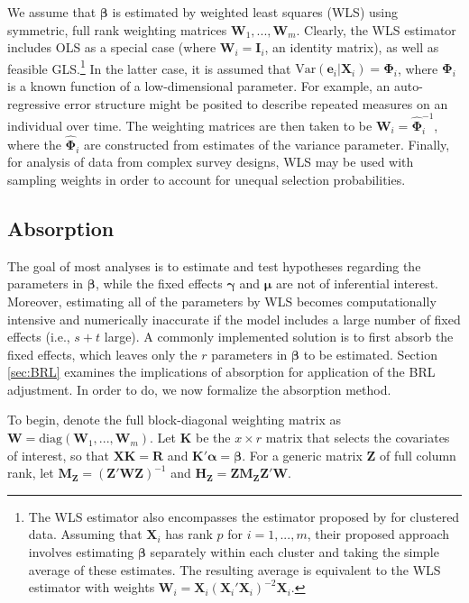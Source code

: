 \documentclass[12pt]{article}\usepackage[]{graphicx}\usepackage[]{color}
\newcommand{\Var}{\text{Var}}
\newcommand{\bm}{\mathbf}
\newcommand{\bs}{\boldsymbol}
\begin{document}
We assume that $\bs\beta$ is estimated by weighted least squares (WLS) using symmetric, full rank weighting matrices $\bm{W}_1,...,\bm{W}_m$. 
Clearly, the WLS estimator includes OLS as a special case (where $\bm{W}_i = \bm{I}_i$, an identity matrix), as well as feasible GLS.\footnote{
The WLS estimator also encompasses the estimator proposed by \citet{Ibragimov2010tstatistic} for clustered data. 
Assuming that $\bm{X}_i$ has rank $p$ for $i = 1,...,m$, their proposed approach involves estimating $\bs\beta$ separately within each cluster and taking the simple average of these estimates. 
The resulting average is equivalent to the WLS estimator with weights $\bm{W}_i = \bm{X}_i \left(\bm{X}_i'\bm{X}_i\right)^{-2} \bm{X}_i$.} 
In the latter case, it is assumed that $\Var\left(\bm{e}_i\left|\bm{X}_i\right.\right) = \bs\Phi_i$, where $\bs\Phi_i$ is a known function of a low-dimensional parameter. 
For example, an auto-regressive error structure might be posited to describe repeated measures on an individual over time. 
The weighting matrices are then taken to be $\bm{W}_i = \hat{\bs\Phi}_i^{-1}$, where the $\hat{\bs\Phi}_i$ are constructed from estimates of the variance parameter.
Finally, for analysis of data from complex survey designs, WLS may be used with sampling weights in order to account for unequal selection probabilities.

\subsection{Absorption}

The goal of most analyses is to estimate and test hypotheses regarding the parameters in $\bs\beta$, while the fixed effects $\bs\gamma$ and $\bs\mu$ are not of inferential interest. Moreover, estimating all of the parameters by WLS becomes computationally intensive and numerically inaccurate if the model includes a large number of fixed effects (i.e., $s + t$ large). 
A commonly implemented solution is to first absorb the fixed effects, which leaves only the $r$ parameters in $\bs\beta$ to be estimated. 
Section \ref{sec:BRL} examines the implications of absorption for application of the BRL adjustment. 
In order to do, we now formalize the absorption method.

To begin, denote the full block-diagonal weighting matrix as $\bm{W} = \text{diag}\left(\bm{W}_1,...,\bm{W}_m\right)$.
Let $\bm{K}$ be the $x \times r$ matrix that selects the covariates of interest, so that $\bm{X} \bm{K} = \bm{R}$ and $\bm{K}'\bs\alpha = \bs\beta$.
For a generic matrix $\bm{Z}$ of full column rank, let $\bm{M_Z} = \left(\bm{Z}'\bm{W}\bm{Z}\right)^{-1}$ and $\bm{H_Z} = \bm{Z}\bm{M_Z}\bm{Z}'\bm{W}$. 
\end{document}
